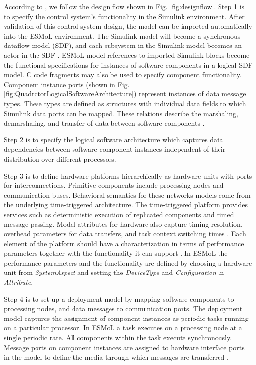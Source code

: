 \documentclass[10pt, conference, compsocconf]{IEEEtran}
\begin{document}
According to \cite{modeling:esmol}, we follow the design flow shown in Fig. \ref{fig:designflow}. Step 1 is to specify the control system's functionality in the Simulink environment. After validation of this control system design, the model can be imported automatically into the ESMoL environment. The Simulink model will become a synchronous dataflow model (SDF), and each subsystem in the Simulink model becomes an actor in the SDF \cite{moc:sdf}. ESMoL model references to imported Simulink blocks become the functional specifications for instances of software components in a logical SDF model. C code fragments may also be used to specify component functionality. Component instance ports (shown in Fig. \ref{fig:QuadrotorLogicalSoftwareArchitecture}) represent instances of data message types. These types are defined as structures with individual data fields to which Simulink data ports can be mapped. These relations describe the marshaling, demarshaling, and transfer of data between software components \cite{modeling:esmol}.

Step 2 is to specify the logical software architecture which captures data dependencies between software component instances independent of their distribution over different processors.

Step 3 is to define hardware platforms hierarchically as hardware units with ports for interconnections. Primitive components include processing nodes and communication buses. Behavioral semantics for these networks models come from the underlying time-triggered architecture. The time-triggered platform provides services such as deterministic execution of replicated components and timed message-passing. Model attributes for hardware also capture timing resolution, overhead parameters for data transfers, and task context switching times \cite{modeling:esmol}. Each element of the platform should have a characterization in terms of performance parameters together with the functionality it can support \cite{modeling:platform}. In ESMoL the performance parameters and the functionality are defined by choosing a hardware unit from \emph{SystemAspect} and setting the \emph{DeviceType} and \emph{Configuration} in \emph{Attribute}.

Step 4 is to set up a deployment model by mapping software components to processing nodes, and data messages to communication ports. The deployment model captures the assignment of component instances as periodic tasks running on a particular processor. In ESMoL a task executes on a processing node at a single periodic rate. All components within the task execute synchronously. Message ports on component instances are assigned to hardware interface ports in the model to define the media through which messages are transferred \cite{modeling:esmol}.
\end{document}
